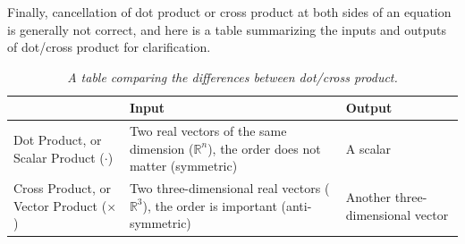 Finally, cancellation of dot product or cross product at both sides of an equation is generally not correct, and here is a table summarizing the inputs and outputs of dot/cross product for clarification.
\begin{table}
\centering
\begin{tabular}{|p{32mm}|p{60mm}|p{26mm}|}
\hline
 & Input & Output \\
\hline
Dot Product, or Scalar Product ($\cdot$) & Two real vectors of the same dimension ($\mathbb{R}^n$), the order does not matter (symmetric) & A scalar\\
\hline
Cross Product, or Vector Product ($\times$) & Two three-dimensional real vectors ($\mathbb{R}^3$), the order is important (anti-symmetric) & Another three-dimensional vector
\\
\hline
\end{tabular}
\caption{\textit{A table comparing the differences between dot/cross product.}}
\end{table}

